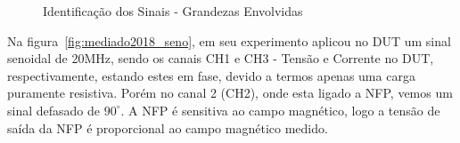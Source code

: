 \begin{figure}[htb!]
	\centering
 	\caption{Identificação dos Sinais - Grandezas Envolvidas}
\end{figure}

Na figura~\ref{fig:mediado2018_seno}, em seu experimento  aplicou no DUT um sinal senoidal de 20MHz, sendo os canais CH1 e CH3 - Tensão e Corrente no DUT, respectivamente, estando estes em fase, devido a termos apenas uma carga puramente resistiva. Porém no canal 2 (CH2), onde esta ligado a NFP, vemos um sinal defasado de $90^{\circ}$. A NFP é sensitiva ao campo magnético, logo a tensão de saída da NFP é proporcional ao campo magnético medido. 


